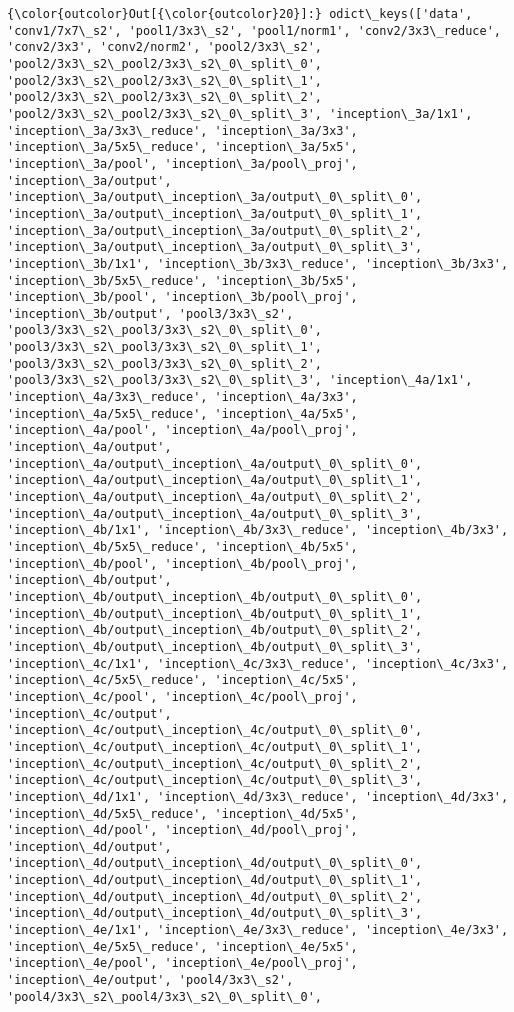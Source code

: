 \documentclass[11pt]{article}
\begin{document}
\begin{Verbatim}[commandchars=\\\{\}]
{\color{outcolor}Out[{\color{outcolor}20}]:} odict\_keys(['data', 'conv1/7x7\_s2', 'pool1/3x3\_s2', 'pool1/norm1', 'conv2/3x3\_reduce', 'conv2/3x3', 'conv2/norm2', 'pool2/3x3\_s2', 'pool2/3x3\_s2\_pool2/3x3\_s2\_0\_split\_0', 'pool2/3x3\_s2\_pool2/3x3\_s2\_0\_split\_1', 'pool2/3x3\_s2\_pool2/3x3\_s2\_0\_split\_2', 'pool2/3x3\_s2\_pool2/3x3\_s2\_0\_split\_3', 'inception\_3a/1x1', 'inception\_3a/3x3\_reduce', 'inception\_3a/3x3', 'inception\_3a/5x5\_reduce', 'inception\_3a/5x5', 'inception\_3a/pool', 'inception\_3a/pool\_proj', 'inception\_3a/output', 'inception\_3a/output\_inception\_3a/output\_0\_split\_0', 'inception\_3a/output\_inception\_3a/output\_0\_split\_1', 'inception\_3a/output\_inception\_3a/output\_0\_split\_2', 'inception\_3a/output\_inception\_3a/output\_0\_split\_3', 'inception\_3b/1x1', 'inception\_3b/3x3\_reduce', 'inception\_3b/3x3', 'inception\_3b/5x5\_reduce', 'inception\_3b/5x5', 'inception\_3b/pool', 'inception\_3b/pool\_proj', 'inception\_3b/output', 'pool3/3x3\_s2', 'pool3/3x3\_s2\_pool3/3x3\_s2\_0\_split\_0', 'pool3/3x3\_s2\_pool3/3x3\_s2\_0\_split\_1', 'pool3/3x3\_s2\_pool3/3x3\_s2\_0\_split\_2', 'pool3/3x3\_s2\_pool3/3x3\_s2\_0\_split\_3', 'inception\_4a/1x1', 'inception\_4a/3x3\_reduce', 'inception\_4a/3x3', 'inception\_4a/5x5\_reduce', 'inception\_4a/5x5', 'inception\_4a/pool', 'inception\_4a/pool\_proj', 'inception\_4a/output', 'inception\_4a/output\_inception\_4a/output\_0\_split\_0', 'inception\_4a/output\_inception\_4a/output\_0\_split\_1', 'inception\_4a/output\_inception\_4a/output\_0\_split\_2', 'inception\_4a/output\_inception\_4a/output\_0\_split\_3', 'inception\_4b/1x1', 'inception\_4b/3x3\_reduce', 'inception\_4b/3x3', 'inception\_4b/5x5\_reduce', 'inception\_4b/5x5', 'inception\_4b/pool', 'inception\_4b/pool\_proj', 'inception\_4b/output', 'inception\_4b/output\_inception\_4b/output\_0\_split\_0', 'inception\_4b/output\_inception\_4b/output\_0\_split\_1', 'inception\_4b/output\_inception\_4b/output\_0\_split\_2', 'inception\_4b/output\_inception\_4b/output\_0\_split\_3', 'inception\_4c/1x1', 'inception\_4c/3x3\_reduce', 'inception\_4c/3x3', 'inception\_4c/5x5\_reduce', 'inception\_4c/5x5', 'inception\_4c/pool', 'inception\_4c/pool\_proj', 'inception\_4c/output', 'inception\_4c/output\_inception\_4c/output\_0\_split\_0', 'inception\_4c/output\_inception\_4c/output\_0\_split\_1', 'inception\_4c/output\_inception\_4c/output\_0\_split\_2', 'inception\_4c/output\_inception\_4c/output\_0\_split\_3', 'inception\_4d/1x1', 'inception\_4d/3x3\_reduce', 'inception\_4d/3x3', 'inception\_4d/5x5\_reduce', 'inception\_4d/5x5', 'inception\_4d/pool', 'inception\_4d/pool\_proj', 'inception\_4d/output', 'inception\_4d/output\_inception\_4d/output\_0\_split\_0', 'inception\_4d/output\_inception\_4d/output\_0\_split\_1', 'inception\_4d/output\_inception\_4d/output\_0\_split\_2', 'inception\_4d/output\_inception\_4d/output\_0\_split\_3', 'inception\_4e/1x1', 'inception\_4e/3x3\_reduce', 'inception\_4e/3x3', 'inception\_4e/5x5\_reduce', 'inception\_4e/5x5', 'inception\_4e/pool', 'inception\_4e/pool\_proj', 'inception\_4e/output', 'pool4/3x3\_s2', 'pool4/3x3\_s2\_pool4/3x3\_s2\_0\_split\_0', 
\end{Verbatim}
\end{document}

